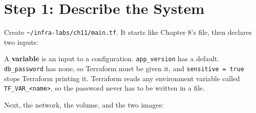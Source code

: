 
\section{Step 1: Describe the System}\label{11-lab-rebuild-everything-from-code:step-1-describe-the-system}

Create \texttt{\textasciitilde{}/}\allowbreak{}\texttt{infra-}\allowbreak{}\texttt{labs/}\allowbreak{}\texttt{ch11/}\allowbreak{}\texttt{main.}\allowbreak{}\texttt{tf}. It starts like Chapter 8's file, then declares two inputs:

\begin{codeblock}

\begin{Shaded}
\begin{Highlighting}[]
\NormalTok{    \}}
\NormalTok{  \}}
\NormalTok{\}}


\NormalTok{\}}

\NormalTok{\}}
\end{Highlighting}
\end{Shaded}

\end{codeblock}

A \textbf{variable} is an input to a configuration. \texttt{app\_version} has a default. \texttt{db\_password} has none, so Terraform must be given it, and \texttt{sensitive\ =\ true} stops Terraform printing it. Terraform reads any environment variable called \texttt{TF\_VAR\_\textless{}name\textgreater{}}, so the password never has to be written in a file.


Next, the network, the volume, and the two images:

